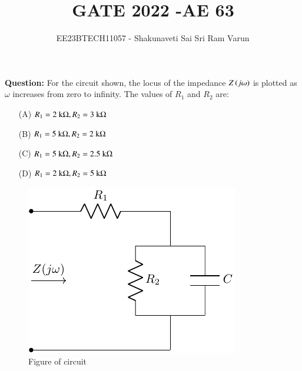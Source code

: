 \documentclass[journal,12pt,twocolumn]{IEEEtran}
\theoremstyle{remark}
\begin{document}

\vspace{3cm}

\title{GATE 2022  -AE 63}
\author{EE23BTECH11057 - Shakunaveti Sai Sri Ram Varun$^{}$%
}
\maketitle
\newpage
\bigskip
\vspace{2cm}
\textbf{Question: }
For the circuit shown, the locus of the impedance $ Z\left(j\omega\right)$ is plotted as $ \omega$ increases from zero to infinity. The values of $ R_1$ and $ R_2$ are:
\begin{enumerate}
    \item[(A)] $ R_1 = 2\text{ k\ohm}, R_2 = 3\text{ k\ohm}$
    \item[(B)]$ R_1 = 5\text{ k\ohm}, R_2 = 2\text{ k\ohm}$
    \item[(C)] $ R_1 = 5\text{ k\ohm}, R_2 = 2.5\text{ k\ohm}$
    \item[(D)] $ R_1 = 2\text{ k\ohm}, R_2 = 5\text{ k\ohm}$
\end{enumerate}

\begin{figure}[h!]
    \includegraphics[width = 0.6\columnwidth]{figs/qn_fig.pdf}
    \caption{Figure of circuit}
    \centering
    \label{fig: qn_fig}
\end{figure}
\end{document}
